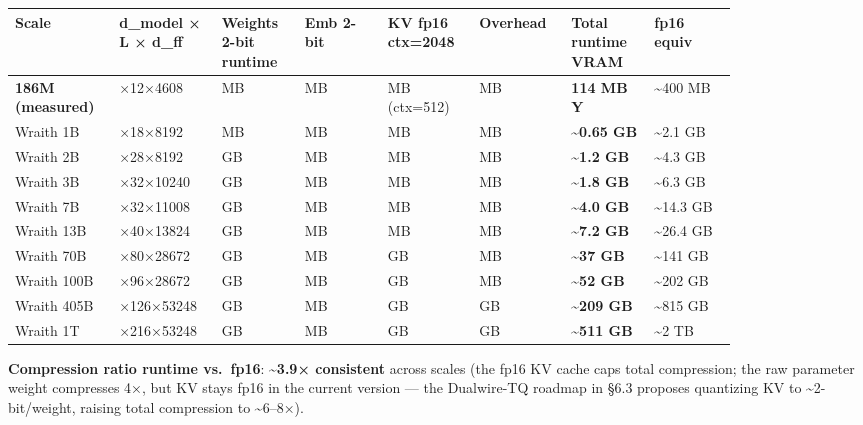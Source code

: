 {\def\LTcaptype{none} %
{\footnotesize\setlength{\tabcolsep}{3pt}
\begin{longtable}[]{@{}>{\raggedright\arraybackslash}p{0.105\linewidth}>{\raggedright\arraybackslash}p{0.105\linewidth}>{\raggedright\arraybackslash}p{0.105\linewidth}>{\raggedright\arraybackslash}p{0.105\linewidth}>{\raggedright\arraybackslash}p{0.105\linewidth}>{\raggedright\arraybackslash}p{0.105\linewidth}>{\raggedright\arraybackslash}p{0.105\linewidth}>{\raggedright\arraybackslash}p{0.105\linewidth}@{}}
\toprule\noalign{}
Scale & d\_model × L × d\_ff & Weights 2-bit runtime & Emb 2-bit & KV fp16 ctx=2048 & Overhead & \textbf{Total runtime VRAM} & fp16 equiv \\
\midrule\noalign{}
\endhead
\bottomrule\noalign{}
\endlastfoot
\textbf{186M (measured)} & 1024×12×4608 & 93 MB & 25 MB & 6 MB (ctx=512)
& 10 MB & \textbf{114 MB Y} & \textasciitilde400 MB \\
Wraith 1B & 2048×18×8192 & 500 MB & 51 MB & 72 MB & 30 MB &
\textbf{\textasciitilde0.65 GB} & \textasciitilde2.1 GB \\
Wraith 2B & 2048×28×8192 & 1.0 GB & 51 MB & 112 MB & 50 MB &
\textbf{\textasciitilde1.2 GB} & \textasciitilde4.3 GB \\
Wraith 3B & 2560×32×10240 & 1.5 GB & 65 MB & 160 MB & 75 MB &
\textbf{\textasciitilde1.8 GB} & \textasciitilde6.3 GB \\
Wraith 7B & 4096×32×11008 & 3.5 GB & 102 MB & 256 MB & 150 MB &
\textbf{\textasciitilde4.0 GB} & \textasciitilde14.3 GB \\
Wraith 13B & 5120×40×13824 & 6.5 GB & 128 MB & 400 MB & 220 MB &
\textbf{\textasciitilde7.2 GB} & \textasciitilde26.4 GB \\
Wraith 70B & 8192×80×28672 & 35 GB & 205 MB & 1.3 GB & 500 MB &
\textbf{\textasciitilde37 GB} & \textasciitilde141 GB \\
Wraith 100B & 8192×96×28672 & 50 GB & 205 MB & 1.6 GB & 700 MB &
\textbf{\textasciitilde52 GB} & \textasciitilde202 GB \\
Wraith 405B & 16384×126×53248 & 203 GB & 410 MB & 4.1 GB & 2 GB &
\textbf{\textasciitilde209 GB} & \textasciitilde815 GB \\
Wraith 1T & 16384×216×53248 & 500 GB & 410 MB & 7 GB & 4 GB &
\textbf{\textasciitilde511 GB} & \textasciitilde2 TB \\
\end{longtable}
}
}

\textbf{Compression ratio runtime vs.~fp16}: \textbf{\textasciitilde3.9×
consistent} across scales (the fp16 KV cache caps total compression; the
raw parameter weight compresses 4×, but KV stays fp16 in the current
version --- the Dualwire-TQ roadmap in §6.3 proposes quantizing KV to
\textasciitilde2-bit/weight, raising total compression to
\textasciitilde6--8×).


